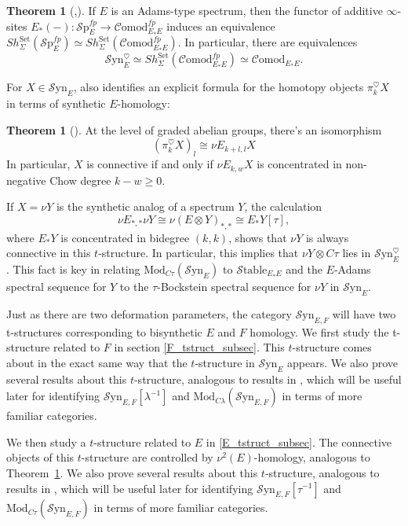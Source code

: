 \documentclass[10pt]{amsart}
\theoremstyle{definition}
\numberwithin{figure}{section}
\numberwithin{equation}{section}
\newtheorem{theorem}[figure]{Theorem}
\theoremstyle{cited}
\newcommand{\Sp}{{\mathcal{S}\mathrm{p}}}
\newcommand{\Mod}{\mathrm{Mod}}
\newcommand{\Syn}{\mathcal{S}\mathrm{yn}}
\newcommand{\Stable}{\mathcal{S}\mathrm{table}}
\newcommand{\Comod}{\mathcal{C}\mathrm{omod}}
\begin{document}
\begin{theorem}[\cite{GH05},\cite{Pst22}]
If $E$ is an Adams-type spectrum, then the functor of additive $\infty$-sites $E_*(-):\Sp_E^{fp}\to\Comod_{E_*E}^{fp}$ induces an equivalence $Sh_{\Sigma}^{\mathrm{Set}}(\Sp_E^{fp})\simeq Sh_{\Sigma}^{\mathrm{Set}}(\Comod_{E_*E}^{fp}).$
In particular, there are equivalences
$$
\Syn_E^{\heartsuit}\simeq Sh_{\Sigma}^{\mathrm{Set}}(\Comod_{E_*E}^{fp})\simeq \Comod_{E_*E}.
$$
\end{theorem}

For $X\in\Syn_E$, \cite{Pst22} also identifies an explicit formula for the homotopy objects $\pi_k^\heartsuit X$ in terms of synthetic $E$-homology:

\begin{theorem}[\cite{Pst22}]
\label{SynE_homology_tstruct}
    At the level of graded abelian groups, there's an isomorphism
$$
(\pi_k^\heartsuit X)_l\cong \nu E_{k+l,l}X
$$
In particular, $X$ is connective if and only if $\nu E_{k,w}X$ is concentrated in non-negative Chow degree $k-w\geq 0$.
\end{theorem}

If $X=\nu Y$ is the synthetic analog of a spectrum $Y$, the calculation
$$
\nu E_{*,*}\nu Y\cong \nu (E\otimes Y)_{*,*}\cong E_*Y[\tau],
$$
where $E_*Y$ is concentrated in bidegree $(k,k)$, shows that $\nu Y$ is always connective in this $t$-structure. In particular, this implies that $\nu Y\otimes C\tau$ lies in $\Syn_E^\heartsuit$. This fact is key in relating $\Mod_{C\tau}(\Syn_E)$ to $\Stable_{E_*E}$ and the $E$-Adams spectral sequence for $Y$ to the $\tau$-Bockstein spectral sequence for $\nu Y$ in $\Syn_E$.

\bigskip

Just as there are two deformation parameters, the category $\Syn_{E,F}$ will have two t-structures corresponding to bisynthetic $E$ and $F$ homology. We first study the t-structure related to $F$ in section \ref{F_tstruct_subsec}. This $t$-structure comes about in the exact same way that the $t$-structure in $\Syn_E$ appears. We also prove several results about this $t$-structure, analogous to results in \cite{Pst22}, which will be useful later for identifying $\Syn_{E,F}[\lambda^{-1}]$ and $\Mod_{C\lambda}(\Syn_{E,F})$ in terms of more familiar categories.

\bigskip

We then study a $t$-structure related to $E$ in \ref{E_tstruct_subsec}. The connective objects of this $t$-structure are controlled by $\nu^2(E)$-homology, analogous to Theorem~\ref{SynE_homology_tstruct}. We also prove several results about this $t$-structure, analogous to results in \cite{Pst22}, which will be useful later for identifying $\Syn_{E,F}[\tau^{-1}]$ and $\Mod_{C\tau}(\Syn_{E,F})$ in terms of more familiar categories.
\end{document}
